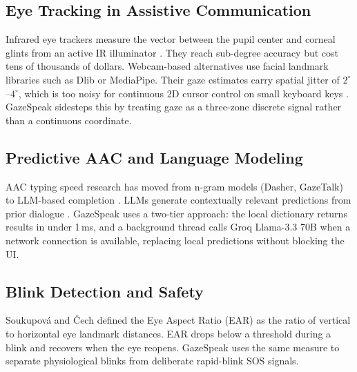 \documentclass[conference]{IEEEtran}
\begin{document}
\subsection{Eye Tracking in Assistive Communication}
Infrared eye trackers measure the vector between the pupil center and corneal glints from an
active IR illuminator \cite{abilkaiyrkyzy2024dialogue}. They reach sub-degree accuracy but cost
tens of thousands of dollars. Webcam-based alternatives use facial landmark libraries such as
Dlib or MediaPipe. Their gaze estimates carry spatial jitter of $2^\circ$--$4^\circ$, which is
too noisy for continuous 2D cursor control on small keyboard keys \cite{lugaresi2019mediapipe}.
GazeSpeak sidesteps this by treating gaze as a three-zone discrete signal rather than a
continuous coordinate.

\subsection{Predictive AAC and Language Modeling}
AAC typing speed research has moved from n-gram models (Dasher, GazeTalk) to LLM-based
completion \cite{trnka2009user}. LLMs generate contextually relevant predictions from prior
dialogue \cite{chen2025detecting, singh2025innovative}. GazeSpeak uses a two-tier approach:
the local dictionary returns results in under 1\,ms, and a background thread calls
Groq Llama-3.3 70B when a network connection is available, replacing local predictions
without blocking the UI.

\subsection{Blink Detection and Safety}
Soukupov{\'a} and {\v{C}}ech \cite{soukupova2016real} defined the Eye Aspect Ratio (EAR) as
the ratio of vertical to horizontal eye landmark distances. EAR drops below a threshold during
a blink and recovers when the eye reopens. GazeSpeak uses the same measure to separate
physiological blinks from deliberate rapid-blink SOS signals.
\end{document}
